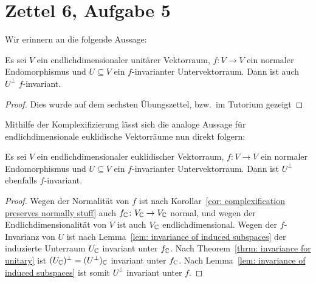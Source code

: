 \documentclass[a4paper,10pt]{article}
\begin{document}
\section{Zettel 6, Aufgabe 5}


Wir erinnern an die folgende Aussage:


\begin{theorem}\label{thrm: invariance for unitary}
  Es sei $V$ ein endlichdimensionaler unitärer Vektorraum, $f \colon V \to V$ ein normaler Endomorphismus und $U \subseteq V$ ein $f$-invarianter Untervektorraum.
  Dann ist auch $U^\perp$ $f$-invariant.
\end{theorem}


\begin{proof}
  Dies wurde auf dem sechsten Übungszettel, bzw.\ im Tutorium gezeigt
\end{proof}


Mithilfe der Komplexifizierung lässt sich die analoge Aussage für endlichdimensionale euklidische Vektorräume nun direkt folgern:


\begin{corollary}
  Es sei $V$ ein endlichdimensionaler euklidischer Vektorraum, $f \colon V \to V$ ein normaler Endomorphismus und $U \subseteq V$ ein $f$-invarianter Untervektorraum.
  Dann ist $U^\perp$ ebenfalls $f$-invariant.
\end{corollary}


\begin{proof}
  Wegen der Normalität von $f$ ist nach Korollar~\ref{cor: complexification preserves normally stuff} auch $f_{\mathbb{C}} \colon V_{\mathbb{C}} \to V_{\mathbb{C}}$ normal, und wegen der Endlichdimensionalität von $V$ ist auch $V_{\mathbb{C}}$ endlichdimensional.
  Wegen der $f$-Invarianz von $U$ ist nach Lemma~\ref{lem: invariance of induced subspaces} der induzierte Unterraum $U_{\mathbb{C}}$ invariant unter $f_{\mathbb{C}}$.
  Nach Theorem~\ref{thrm: invariance for unitary} ist $(U_{\mathbb{C}})^\perp = (U^\perp)_{\mathbb{C}}$ invariant unter $f_{\mathbb{C}}$.
  Nach Lemma~\ref{lem: invariance of induced subspaces} ist somit $U^\perp$ invariant unter $f$.
\end{proof}
\end{document}
